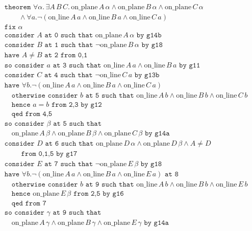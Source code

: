 \documentclass{article}
\newcommand{\online}[2]{\text{on\_line}\,#1\,#2}
\newcommand{\onplane}[2]{\text{on\_plane}\,#1\,#2}
\newcommand{\Triangle}[4]{\forall #1.\neg(\online{#2}{a}\wedge \online{#3}{a}\wedge \online{#4}{a})}
\begin{document}
\begin{figure}
\small
\begin{align*}
&\texttt{theorem }\forall\alpha.\,\exists A\,B\,C.\,\onplane{A}{\alpha} \wedge \onplane{B}{\alpha} \wedge  \onplane{C}{\alpha}\\
&\qquad\wedge  \Triangle{a}{A}{B}{C}\\
&\texttt{fix } \alpha\\
&\texttt{consider } A \texttt{ at 0 such that } \onplane{A}{\alpha} \texttt{ by g14b}\\
&\texttt{consider } B \texttt{ at 1 such that } \neg \onplane{B}{\alpha} \texttt{ by g18}\\
&\texttt{have } A \neq B \texttt{ at 2 from 0,1}\\
&\texttt{so consider } a \texttt{ at 3 such that } \online{A}{a} \wedge  \online{B}{a} \texttt{ by g11}\\
&\texttt{consider } C \texttt{ at 4 such that } \neg \online{C}{a} \texttt{ by g13b}\\
&\texttt{have } \Triangle{b}{A}{B}{C}\\
&\quad\texttt{otherwise consider } b \texttt{ at 5 such that }\online{A}{b}\wedge \online{B}{b}\wedge \online{C}{b}\\
&\quad\texttt{hence } a = b \texttt{ from 2,3 by g12}\\
&\quad\texttt{qed from 4,5}\\
&\texttt{so consider } \beta \texttt{ at 5 such that }\\
&\quad\onplane{A}{\beta}\wedge \onplane{B}{\beta}\wedge \onplane{C}{\beta} \texttt{ by g14a}\\
&\texttt{consider } D \texttt{ at 6 such that } \onplane{D}{\alpha}\wedge \onplane{D}{\beta}\wedge A\neq D \\
&\qquad\texttt{ from 0,1,5 by g17}\\
&\texttt{consider } E \texttt{ at 7 such that } \neg \onplane{E}{\beta} \texttt{ by g18}\\
&\texttt{have } \Triangle{b}{A}{B}{E} \texttt{ at 8}\\
&\quad\texttt{otherwise consider } b \texttt{ at 9 such that }\online{A}{b}\wedge \online{B}{b}\wedge  \online{E}{b}\\
&\quad\texttt{hence }\onplane{E}{\beta} \texttt{ from 2,5 by g16}\\
&\quad\texttt{qed from 7}\\
&\texttt{so consider } \gamma \texttt{ at 9 such that}\\
&\quad\onplane{A}{\gamma}\wedge \onplane{B}{\gamma}\wedge \onplane{E}{\gamma}\texttt{ by g14a}\\

\end{align*}
\end{figure}
\end{document}
